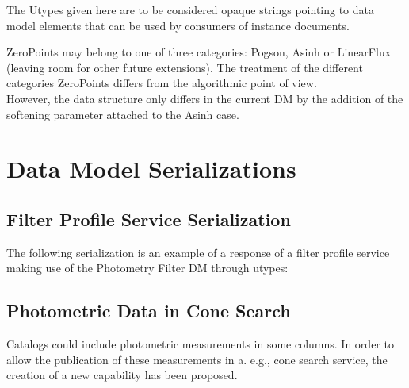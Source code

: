 \documentclass[11pt,a4paper]{ivoa}
\begin{document}
\begin{appendices}
The Utypes given here are to be considered opaque strings pointing to data model
elements that can be used by consumers of instance documents.

ZeroPoints may belong to one of three categories: Pogson, Asinh or LinearFlux 
(leaving room for other future extensions). The treatment of the different 
categories ZeroPoints differs from the algorithmic point of view. \\
However, the data structure only differs in the current DM by the addition 
of the softening parameter attached to the Asinh case.

\par

\section{Data Model Serializations} \label{serialization}
\subsection{Filter Profile Service Serialization} \label{serializationfilter}

    
The following serialization is an example of a response of a filter profile 
service making use of the Photometry Filter DM through utypes:
\par


\subsection{Photometric Data in Cone Search}
Catalogs could include photometric measurements in some columns. In order 
to allow the publication of these measurements in a. e.g., cone search 
service, the creation of a new capability has been proposed.
\par


\end{appendices}
\end{document}
